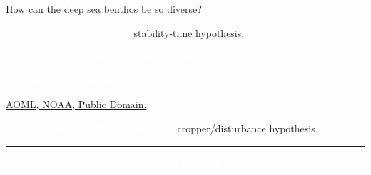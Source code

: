 \documentclass[t]{beamer}
\begin{document}

{
\begin{frame}[t]{How can the deep sea benthos be so diverse?}


\end{frame}}

{
\begin{frame}[t]{\textcolor{white}{Sanders (1968) proposed the} \textcolor{orange4}{stability-time hypothesis.}} 

	\hangpara \textcolor{white}{What is the importance of stability and time?}

	\hangpara \textcolor{white}{What were the arguments against this hypothesis?}

\tinyfill\textcolor{white}{\href{https://www.aoml.noaa.gov/deep-sea-is-slowing-warming/}{AOML, NOAA, Public Domain.}}

\end{frame}
}
%

%
%
%

{
\begin{frame}[t]{\textcolor{white}{Dayton \& Hessler (1972) proposed the} \textcolor{orange4}{cropper/disturbance hypothesis.}}

\vspace{-1.05\baselineskip}



\textcolor{white}{\rule{650px}{0.4pt}}

\vfilll

\tiny \textcolor{white}{Sea pigs, \textcopyright\,Monterrey Bay Aquariun and Research Institute}
\end{frame}
}
%
%
%
%
%
\end{document}
